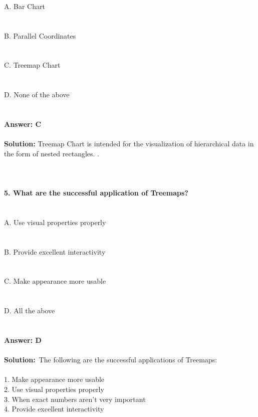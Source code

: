 \documentclass[prl,twocolumn,showpacs,preprintnumbers,superscriptaddress]{revtex4}
\theoremstyle{plain}
\theoremstyle{definition}
\begin{document}
\begin{widetext}
\\
\\
\\
A. Bar Chart
\\
\\
\\
B. Parallel Coordinates
\\
\\
\\
C. Treemap Chart
\\
\\
\\
D. None of the above
\\
\\
\\
\textbf{Answer: C}
\\
\\
\textbf{Solution:}
Treemap Chart is intended for the visualization of hierarchical data in the form of nested rectangles. . 
\\
\\
\\
\\
\newpage
\noindent\textbf{5. What are the successful application of Treemaps?}
\\
\\
\\
\noindent A. Use visual properties properly
\\
\\
\\
B.  Provide excellent interactivity
\\
\\
\\
C. Make appearance more usable
\\
\\
\\
D. All the above
\\
\\
\\
\textbf{Answer: D}
\\
\\
\textbf{Solution:}\ 
The following are the successful applications of Treemaps:
\\
\\
1. Make appearance more usable
\\
2. Use visual properties properly
\\
3. When exact numbers aren't very important
\\
4. Provide excellent interactivity 
\\
\\
\\
\end{widetext}
\end{document}
